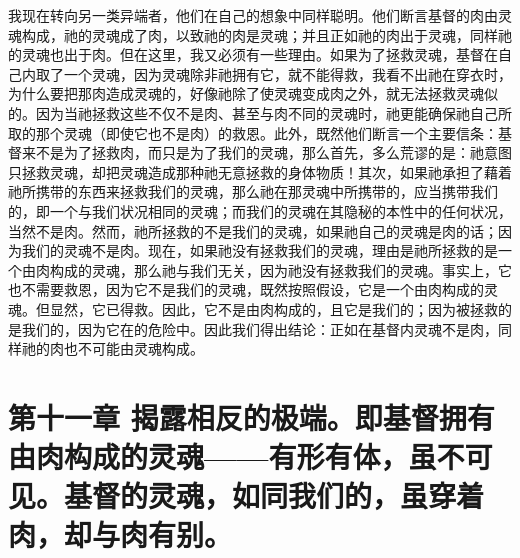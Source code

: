 我现在转向另一类异端者，他们在自己的想象中同样聪明。他们断言基督的肉由灵魂构成，祂的灵魂成了肉，以致祂的肉是灵魂；并且正如祂的肉出于灵魂，同样祂的灵魂也出于肉。但在这里，我又必须有一些理由。如果为了拯救灵魂，基督在自己内取了一个灵魂，因为灵魂除非祂拥有它，就不能得救，我看不出祂在穿衣时，为什么要把那肉造成灵魂的，好像祂除了使灵魂变成肉之外，就无法拯救灵魂似的。因为当祂拯救这些不仅不是肉、甚至与肉不同的灵魂时，祂更能确保祂自己所取的那个灵魂（即使它也不是肉）的救恩。此外，既然他们断言一个主要信条：基督来不是为了拯救肉，而只是为了我们的灵魂，那么首先，多么荒谬的是：祂意图只拯救灵魂，却把灵魂造成那种祂无意拯救的身体物质！其次，如果祂承担了藉着祂所携带的东西来拯救我们的灵魂，那么祂在那灵魂中所携带的，应当携带我们的，即一个与我们状况相同的灵魂；而我们的灵魂在其隐秘的本性中的任何状况，当然不是肉。然而，祂所拯救的不是我们的灵魂，如果祂自己的灵魂是肉的话；因为我们的灵魂不是肉。现在，如果祂没有拯救我们的灵魂，理由是祂所拯救的是一个由肉构成的灵魂，那么祂与我们无关，因为祂没有拯救我们的灵魂。事实上，它也不需要救恩，因为它不是我们的灵魂，既然按照假设，它是一个由肉构成的灵魂。但显然，它已得救。因此，它不是由肉构成的，且它是我们的；因为被拯救的是我们的，因为它在的危险中。因此我们得出结论：正如在基督内灵魂不是肉，同样祂的肉也不可能由灵魂构成。\par


\section{第十一章 揭露相反的极端。即基督拥有由肉构成的灵魂——有形有体，虽不可见。基督的灵魂，如同我们的，虽穿着肉，却与肉有别。}

